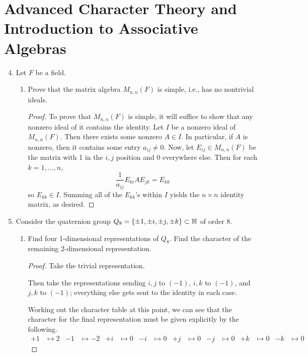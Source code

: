 \documentclass[../psets.tex]{subfiles}
\begin{document}
\section{Advanced Character Theory and Introduction to Associative Algebras}
\begin{enumerate}
    \setcounter{enumi}{3}
    \item {}Let $F$ be a field.
    \begin{enumerate}
        \item Prove that the matrix algebra $M_{n,n}(F)$ is simple, i.e., has no nontrivial ideals.
        \begin{proof}
            To prove that $M_{n,n}(F)$ is simple, it will suffice to show that any nonzero ideal of it contains the identity. Let $I$ be a nonzero ideal of $M_{n,n}(F)$. Then there exists some nonzero $A\in I$. In particular, if $A$ is nonzero, then it contains some entry $a_{ij}\neq 0$. Now, let $E_{ij}\in M_{n,n}(F)$ be the matrix with 1 in the $i,j$ position and 0 everywhere else. Then for each $k=1,\dots,n$,
            \begin{equation*}
                \frac{1}{a_{ij}}E_{ki}AE_{jk} = E_{kk}
            \end{equation*}
            so $E_{kk}\in I$. Summing all of the $E_{kk}$'s within $I$ yields the $n\times n$ identity matrix, as desired.
        \end{proof}
    \end{enumerate}
    \item Consider the quaternion group $Q_8=\{\pm 1,\pm i,\pm j,\pm k\}\subset\mathbb{H}$ of order 8.
    \begin{enumerate}
        \item Find four 1-dimensional representations of $Q_8$. Find the character of the remaining 2-dimensional representation.
        \begin{proof}
            Take the trivial representation.\par
            Then take the representations sending $i,j$ to $(-1)$, $i,k$ to $(-1)$, and $j,k$ to $(-1)$; everything else gets sent to the identity in each case.\par
            Working out the character table at this point, we can see that the character for the final representation must be given explicitly by the following.
            \begin{align*}
                +1 &\mapsto 2&
                -1 &\mapsto -2&
                +i &\mapsto 0&
                -i &\mapsto 0&
                +j &\mapsto 0&
                -j &\mapsto 0&
                +k &\mapsto 0&
                -k &\mapsto 0
            \end{align*}
        \end{proof}
    \end{enumerate}
\end{enumerate}
\end{document}
